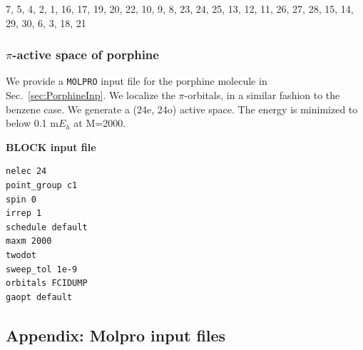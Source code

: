 \documentclass[letterpaper,12pt,aps, pra]{revtex4-1}
\begin{document}
 7,  5,  4,  2,  1,
16, 17, 19, 20, 22,
10,  9,  8, 23, 24,
25, 13, 12, 11, 26,
27, 28, 15, 14, 29,
30,  6,  3, 18, 21            

\subsubsection{$\pi$-active space of porphine}

We provide a \texttt{MOLPRO} input file for the porphine molecule in Sec.~\ref{sec:PorphineInp}. We localize the $\pi$-orbitals, in a similar fashion to the 
benzene case. We generate a (24e, 24o) active space. The energy is minimized to 
below 0.1 m$E_h$ at M=2000.

\textbf{BLOCK input file}
\begin{verbatim}
nelec 24
point_group c1
spin 0
irrep 1
schedule default
maxm 2000
twodot
sweep_tol 1e-9
orbitals FCIDUMP
gaopt default
\end{verbatim}

\subsection{Appendix: Molpro input files}\label{sec:appMolpro}
\end{document}
